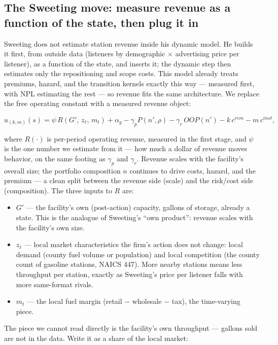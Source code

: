\documentclass[
  letterpaper,
  DIV=11,
  numbers=noendperiod]{scrartcl}
\providecommand{\tightlist}{%
  \setlength{\itemsep}{0pt}\setlength{\parskip}{0pt}}\usepackage{longtable,booktabs,array}
\begin{document}
\subsection{The Sweeting move: measure revenue as a function of the
state, then plug it
in}\label{the-sweeting-move-measure-revenue-as-a-function-of-the-state-then-plug-it-in}

Sweeting does not estimate station revenue inside his dynamic model. He
builds it first, from outside data (listeners by demographic \(\times\)
advertising price per listener), as a function of the state, and inserts
it; the dynamic step then estimates only the repositioning and scope
costs. This model already treats premiums, hazard, and the transition
kernels exactly this way --- measured first, with NPL estimating the
rest --- so revenue fits the same architecture. We replace the free
operating constant with a measured revenue object:

\[
u_{(k,m)}(s) = \psi\, R(G',\, z_\ell,\, m_t) + \alpha_g
- \gamma_p P(n',\rho) - \gamma_r\, OOP(n') - k\,c^{rem} - m\,c^{inst},
\]

where \(R(\cdot)\) is per-period operating revenue, measured in the
first stage, and \(\psi\) is the one number we estimate from it --- how
much a dollar of revenue moves behavior, on the same footing as
\(\gamma_p\) and \(\gamma_r\). Revenue scales with the facility's
overall size; the portfolio composition \(n\) continues to drive costs,
hazard, and the premium --- a clean split between the revenue side
(scale) and the risk/cost side (composition). The three inputs to \(R\)
are:

\begin{itemize}
\tightlist
\item
  \(G'\) --- the facility's own (post-action) capacity, gallons of
  storage, already a state. This is the analogue of Sweeting's ``own
  product'': revenue scales with the facility's own size.
\item
  \(z_\ell\) --- local market characteristics the firm's action does not
  change: local demand (county fuel volume or population) and local
  competition (the county count of gasoline stations, NAICS 447). More
  nearby stations means less throughput per station, exactly as
  Sweeting's price per listener falls with more same-format rivals.
\item
  \(m_t\) --- the local fuel margin (retail \(-\) wholesale \(-\) tax),
  the time-varying piece.
\end{itemize}

The piece we cannot read directly is the facility's own throughput ---
gallons sold are not in the data. Write it as a share of the local
market:
\end{document}
